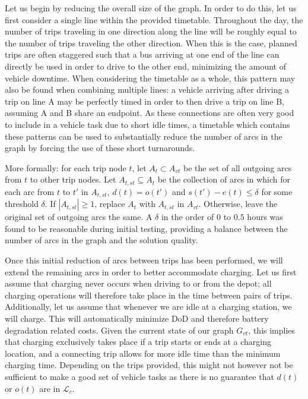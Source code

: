 \documentclass[]{article}
\begin{document}
Let us begin by reducing the overall size of the graph. In order to do this, let us first consider a single line within the provided timetable. Throughout the day, the number of trips traveling in one direction along the line will be roughly equal to the number of trips traveling the other direction. When this is the case, planned trips are often staggered such that a bus arriving at one end of the line can directly be used in order to drive to the other end, minimizing the amount of vehicle downtime. When considering the timetable as a whole, this pattern may also be found when combining multiple lines: a vehicle arriving after driving a trip on line A may be perfectly timed in order to then drive a trip on line B, assuming A and B share an endpoint. As these connections are often very good to include in a vehicle task due to short idle times, a timetable which contains these patterns can be used to substantially reduce the number of arcs in the graph by forcing the use of these short turnarounds. 

 More formally: for each trip node $t$, let $A_t \subset A_{vt}$ be the set of all outgoing arcs from $t$ to other trip nodes. Let $A_{t,st} \subseteq A_t$ be the collection of arcs in which for each arc from $t$ to $t'$ in $A_{t,st}$, $d(t) = o(t')$ and $s(t') - e(t) \leq \delta$ for some threshold $\delta$. If $|A_{t,st}| \geq 1$, replace $A_t$ with $A_{t,st}$ in $A_{vt}$. Otherwise, leave the original set of outgoing arcs the same. A $\delta$ in the order of $0$ to $0.5$ hours was found to be reasonable during initial testing, providing a balance between the number of arcs in the graph and the solution quality.

Once this initial reduction of arcs between trips has been performed, we will extend the remaining arcs in order to better accommodate charging. Let us first assume that charging never occurs when driving to or from the depot; all charging operations will therefore take place in the time between pairs of trips. Additionally, let us assume that whenever we are idle at a charging station, we will charge. This will automatically minimize DoD and therefore battery degradation related costs. Given the current state of our graph $G_{vt}$, this implies that charging exclusively takes place if a trip starts or ends at a charging location, and a connecting trip allows for more idle time than the minimum charging time. Depending on the trips provided, this might not however not be sufficient to make a good set of vehicle tasks as there is no guarantee that $d(t)$ or $o(t)$ are in $\mathcal{L}_c$.
\end{document}
